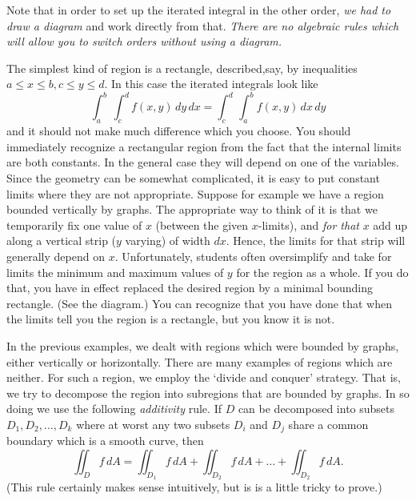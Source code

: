 Note that in order to set up the iterated integral in the other
order, {\it we had to draw a diagram\/} and work directly from
that.   {\it There are no algebraic rules which will allow you
to switch orders without using a diagram.}
\endexample

The simplest kind of region is a rectangle, described,say, by
inequalities $a \le x \le b, c \le y \le d$.   In this case
the iterated integrals look like
$$
\int_a^b \, \int_c^d f(x,y)\, dy \, dx
  = 
\int_c^d \, \int_a^b f(x,y)\, dx \, dy
$$
and it should not make much difference which you choose.  You
should immediately recognize a rectangular region from the
fact that the internal limits are both constants.  In the 
general case they will depend on one of the variables.
Since the geometry can be somewhat complicated, it is easy
to put constant limits where they are not appropriate.
Suppose for example we have a region bounded vertically
by graphs.  The appropriate way to think of it is that
we temporarily fix one value of $x$ (between the given
$x$-limits), and {\it for that\/} $x$ add up along a
vertical strip ($y$ varying) of width $dx$.  Hence, the
limits for that strip will generally depend on $x$.
Unfortunately, students often oversimplify and 
take for limits the minimum and maximum values of $y$
for the region as a whole.  If you do that, you have
in effect replaced the desired region by a minimal bounding
rectangle.  (See the diagram.)    You can recognize that
you have done that when the limits tell you the region is
a rectangle, but you know it is not.
\medskip
\centerline{}
\medskip
In the previous examples, we dealt with regions which were bounded
by graphs, either vertically or horizontally.  There are many
examples of regions which are neither.  For such a region,
we employ the `divide and conquer' strategy.  That is, we
try to decompose the region into subregions that are bounded
by graphs.
In so doing we use the following 
{\it additivity\/} rule.   If $D$ can be decomposed into
subsets  $D_1, D_2, \dots, D_k$ where at worst any two subsets
$D_i$ and $D_j$ share a common boundary which is a smooth curve,
then
$$
 \iint_D f\, dA =
 \iint_{D_1} f\, dA +
 \iint_{D_2} f\, dA + \dots +
 \iint_{D_2} f\, dA.
$$
(This rule certainly makes sense intuitively, but is is a little
tricky to prove.)


